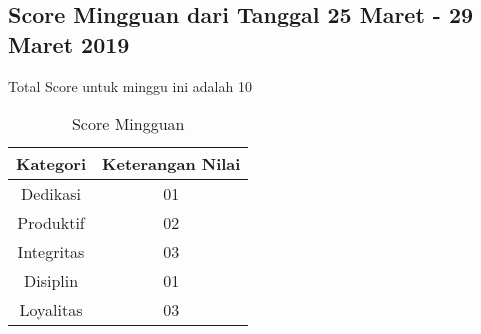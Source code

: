 \subsection{Score Mingguan dari Tanggal 25 Maret - 29 Maret 2019}
Total Score untuk minggu ini adalah 10

\begin{table}[h]
\caption{Score Mingguan}
\centering
\begin{tabular}{|c|c|}
\hline
\textbf{Kategori}&\textbf{Keterangan Nilai}\\
\hline
Dedikasi&01\\
\hline
Produktif&02\\
\hline
Integritas&03\\
\hline
Disiplin&01\\
\hline
Loyalitas&03\\
\hline
\end{tabular}
\label{table:score mingguan}
\end{table} 